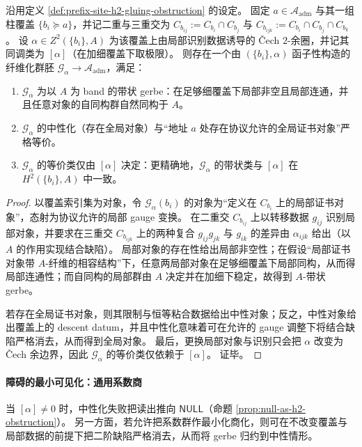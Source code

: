 \begin{theorem}\label{thm:prefix-site-cech-null-gerbe}
沿用定义 \ref{def:prefix-site-h2-gluing-obstruction} 的设定。
固定 \(a\in\mathcal{A}_{\mathrm{adm}}\) 与其一组柱覆盖 \(\{b_i\succeq a\}\)，并记二重与三重交为
\(
C_{b_{ij}}:=C_{b_i}\cap C_{b_j}
\)
与
\(
C_{b_{ijk}}:=C_{b_i}\cap C_{b_j}\cap C_{b_k}
\)。
设 \(\alpha\in Z^2(\{b_i\},A)\) 为该覆盖上由局部识别数据诱导的 Čech \(2\)-余圈，并记其同调类为 \([\alpha]\)（在加细覆盖下取极限）。
则存在一个由 \((\{b_i\},\alpha)\) 函子性构造的纤维化群胚 \(\mathcal{G}_\alpha\to \mathcal{A}_{\mathrm{adm}}\)，满足：
\begin{enumerate}
  \item \(\mathcal{G}_\alpha\) 为以 \(A\) 为 band 的带状 gerbe：在足够细覆盖下局部非空且局部连通，并且任意对象的自同构群自然同构于 \(A\)。
  \item \(\mathcal{G}_\alpha\) 的中性化（存在全局对象）与“地址 \(a\) 处存在协议允许的全局证书对象”严格等价。
  \item \(\mathcal{G}_\alpha\) 的等价类仅由 \([\alpha]\) 决定：更精确地，\(\mathcal{G}_\alpha\) 的带状类与 \([\alpha]\) 在 \(H^2(\{b_i\},A)\) 中一致。
\end{enumerate}
\end{theorem}

\begin{proof}
以覆盖索引集为对象，令 \(\mathcal{G}_\alpha(b_i)\) 的对象为“定义在 \(C_{b_i}\) 上的局部证书对象”，态射为协议允许的局部 gauge 变换。
在二重交 \(C_{b_{ij}}\) 上以转移数据 \(g_{ij}\) 识别局部对象，并要求在三重交 \(C_{b_{ijk}}\) 上的两种复合 \(g_{ij}g_{jk}\) 与 \(g_{ik}\) 的差异由 \(\alpha_{ijk}\) 给出（以 \(A\) 的作用实现结合缺陷）。
局部对象的存在性给出局部非空性；在假设“局部证书对象带 \(A\)-纤维的相容结构”下，任意两局部对象在足够细覆盖下局部同构，从而得局部连通性；而自同构的局部群由 \(A\) 决定并在加细下稳定，故得到 \(A\)-带状 gerbe。
\par
若存在全局证书对象，则其限制与恒等粘合数据给出中性对象；反之，中性对象给出覆盖上的 descent datum，并且中性化意味着可在允许的 gauge 调整下将结合缺陷严格消去，从而得到全局对象。
最后，更换局部对象与识别只会把 \(\alpha\) 改变为 Čech 余边界，因此 \(\mathcal{G}_\alpha\) 的等价类仅依赖于 \([\alpha]\)。
证毕。
\end{proof}

\paragraph{障碍的最小可见化：通用系数商}
当 \([\alpha]\neq 0\) 时，中性化失败把读出推向 \(\mathsf{NULL}\)（命题 \ref{prop:null-as-h2-obstruction}）。
另一方面，若允许把系数群作最小化商化，则可在不改变覆盖与局部数据的前提下把二阶缺陷严格消去，从而将 gerbe 归约到中性情形。

